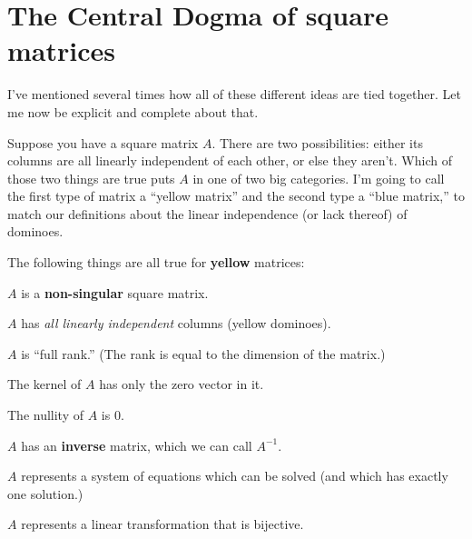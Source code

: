 \section{The Central Dogma of square matrices}

I've mentioned several times how all of these different ideas are tied
together. Let me now be explicit and complete about that.


Suppose you have a square matrix $A$. There are two possibilities: either its
columns are all linearly independent of each other, or else they aren't. Which
of those two things are true puts $A$ in one of two big categories. I'm going
to call the first type of matrix a ``yellow matrix'' and the second type a
``blue matrix,'' to match our definitions about the linear independence (or
lack thereof) of dominoes.

\pagebreak
The following things are all true for \textbf{yellow} matrices:


\begin{framed}
\begin{compactitem}
\item $A$ is a \textbf{non-singular} square matrix.
\item $A$ has \textit{all linearly independent} columns (yellow dominoes).
\item $A$ is ``full rank.'' (The rank is equal to the dimension of the matrix.)
\item The kernel of $A$ has only the zero vector in it.
\item The nullity of $A$ is 0.
\item $A$ has an \textbf{inverse} matrix, which we can call $A^{-1}$.
\item $A$ represents a system of equations which can be solved (and which has
exactly one solution.)
\item $A$ represents a linear transformation that is bijective.
\end{compactitem}
\end{framed}


